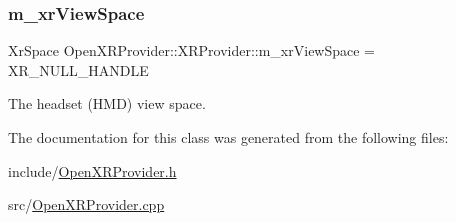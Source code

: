 \subsubsection{\texorpdfstring{m\_xrViewSpace}{m\_xrViewSpace}}
{\footnotesize\ttfamily Xr\+Space Open\+X\+R\+Provider\+::\+X\+R\+Provider\+::m\+\_\+xr\+View\+Space = X\+R\+\_\+\+N\+U\+L\+L\+\_\+\+H\+A\+N\+D\+LE\hspace{0.3cm}{\ttfamily [private]}}



The headset (H\+MD) view space. 



The documentation for this class was generated from the following files\+:\begin{DoxyCompactItemize}
\item 
include/\mbox{\hyperlink{_open_x_r_provider_8h}{Open\+X\+R\+Provider.\+h}}\item 
src/\mbox{\hyperlink{_open_x_r_provider_8cpp}{Open\+X\+R\+Provider.\+cpp}}\end{DoxyCompactItemize}
